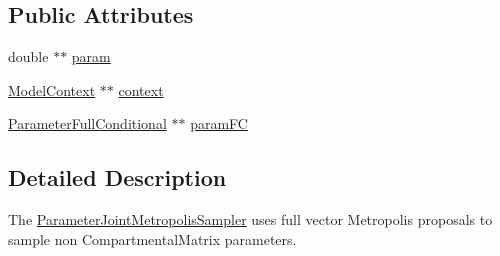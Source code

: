 \subsection*{Public Attributes}
\begin{DoxyCompactItemize}
\item 
double $\ast$$\ast$ \hyperlink{classSpatialSEIR_1_1ParameterJointMetropolisSampler_afead5b10ba404c235e7042670c350eeb}{param}
\item 
\hyperlink{classSpatialSEIR_1_1ModelContext}{Model\-Context} $\ast$$\ast$ \hyperlink{classSpatialSEIR_1_1ParameterJointMetropolisSampler_a342dea442e235b1deefe2c16dd3e95e8}{context}
\item 
\hyperlink{classSpatialSEIR_1_1ParameterFullConditional}{Parameter\-Full\-Conditional} $\ast$$\ast$ \hyperlink{classSpatialSEIR_1_1ParameterJointMetropolisSampler_a2ceafdb76768003ed5eaa4b22ca6afeb}{param\-F\-C}
\end{DoxyCompactItemize}


\subsection{Detailed Description}
The \hyperlink{classSpatialSEIR_1_1ParameterJointMetropolisSampler}{Parameter\-Joint\-Metropolis\-Sampler} uses full vector Metropolis proposals to sample non Compartmental\-Matrix parameters. 

